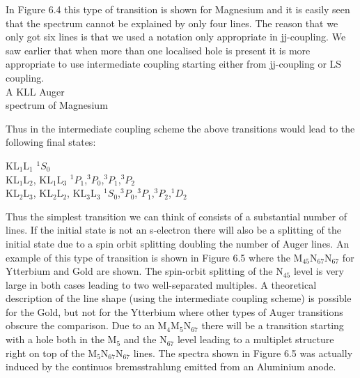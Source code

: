              In Figure 6.4  this  type  of  transition  is  shown  for
          Magnesium and it is easily seen that the spectrum cannot  be
          explained by only four lines. The reason that  we  only  got
          six lines is that we used a notation  only  appropriate  in
          jj-coupling.  We  saw  earlier  that  when  more  than   one
          localised hole is present it  is  more  appropriate  to  use
          intermediate coupling starting either from jj-coupling or LS
          coupling.\\

         A KLL Auger\\ spectrum of Magnesium\\

             \vspace*{9cm}


             Thus  in  the  intermediate  coupling  scheme  the  above
          transitions would lead to the following final states:

             \vspace{0.5cm}

          \noindent     KL$_{1}$L$_{1}$      \hfill      $^{1}S_{0}$\\
          KL$_{1}$L$_{2}$,           KL$_{1}$L$_{3}$            \hfill
          $^{1}P_{1}$,$^{3}P_{0}$,$^{3}P_{1}$,$^{3}P_{2}$\\
          KL$_{2}$L$_{3}$,  KL$_{2}$L$_{2}$,  KL$_{3}$L$_{3}$   \hfill
          $^{1}S_{0}$,$^{3}P_{0}$,$^{3}P_{1}$,$^{3}P_{2}$,$^{1}D_{2}$\\

          \vspace{0.5cm}

             Thus the simplest transition we can think of consists of a
          substantial number of lines. If the initial state is not  an
          s-electron there will also be a  splitting  of  the  initial
          state due to a spin orbit splitting doubling the  number  of
          Auger lines. An example of this type of transition is  shown
          in  Figure 6.5  where  the   M$_{45}$N$_{67}$N$_{67}$   for
          Ytterbium and Gold are shown. The  spin-orbit  splitting  of
          the N$_{45}$ level is very large in both  cases  leading  to
          two well-separated multiples. A theoretical description  of
          the line shape (using the intermediate coupling  scheme)  is
          possible for the Gold, but not for the Ytterbium where other
          types of Auger transitions obscure the comparison. Due to an
          M$_{4}$M$_{5}$N$_{67}$ there will be a  transition  starting
          with a hole both in  the  M$_{5}$  and  the  N$_{67}$  level
          leading to  a  multiplet  structure  right  on  top  of  the
          M$_{5}$N$_{67}$N$_{67}$ lines. The spectra shown  in  Figure
          6.5 was actually induced  by  the  continuos  bremsstrahlung
          emitted from an Aluminium anode.\\

